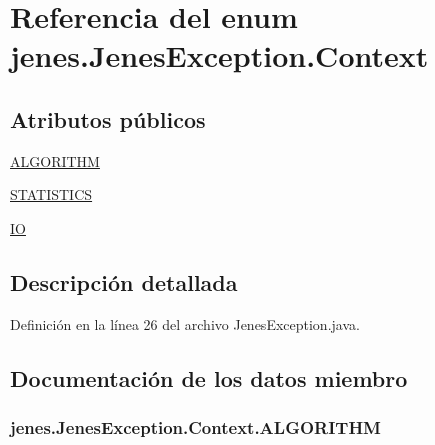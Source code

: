 \hypertarget{enumjenes_1_1_jenes_exception_1_1_context}{\section{Referencia del enum jenes.\-Jenes\-Exception.\-Context}
\label{enumjenes_1_1_jenes_exception_1_1_context}
}
\subsection*{Atributos públicos}
\begin{DoxyCompactItemize}
\item 
\hyperlink{enumjenes_1_1_jenes_exception_1_1_context_ae925bab13906bd4450260c30cc7b4cab}{A\-L\-G\-O\-R\-I\-T\-H\-M}
\item 
\hyperlink{enumjenes_1_1_jenes_exception_1_1_context_ae0335a1dcf69b5493fac24c4c2c25cd1}{S\-T\-A\-T\-I\-S\-T\-I\-C\-S}
\item 
\hyperlink{enumjenes_1_1_jenes_exception_1_1_context_a023d03d781868c33bd25415d7c5602d0}{I\-O}
\end{DoxyCompactItemize}


\subsection{Descripción detallada}


Definición en la línea 26 del archivo Jenes\-Exception.\-java.



\subsection{Documentación de los datos miembro}
\hypertarget{enumjenes_1_1_jenes_exception_1_1_context_ae925bab13906bd4450260c30cc7b4cab}{
\subsubsection[{A\-L\-G\-O\-R\-I\-T\-H\-M}]{\setlength{\rightskip}{0pt plus 5cm}jenes.\-Jenes\-Exception.\-Context.\-A\-L\-G\-O\-R\-I\-T\-H\-M}}\label{enumjenes_1_1_jenes_exception_1_1_context_ae925bab13906bd4450260c30cc7b4cab}


